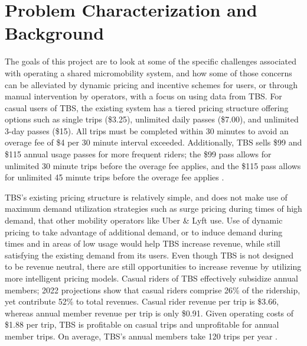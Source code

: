 \documentclass[conference]{IEEEtran}
\begin{document}
\section{Problem Characterization and Background}
The goals of this project are to look at some of the specific challenges associated with operating a shared micromobility system, and how some of those concerns can be alleviated by dynamic pricing and incentive schemes for users, or through manual intervention by operators, with a focus on using data from TBS. For casual users of TBS, the existing system has a tiered pricing structure offering options such as single trips (\$3.25),  unlimited daily passes (\$7.00), and unlimited 3-day passes (\$15). All trips must be completed within 30 minutes to avoid an overage fee of \$4 per 30 minute interval exceeded. Additionally, TBS sells \$99 and \$115 annual usage passes for more frequent riders; the \$99 pass allows for unlimited 30 minute trips before the overage fee applies, and the \$115 pass allows for unlimited 45 minute trips before the overage fee applies \cite{tbs_pricing}. 

TBS's existing pricing structure is relatively simple, and does not make use of maximum demand utilization strategies such as surge pricing during times of high demand, that other mobility operators like Uber \& Lyft use. Use of dynamic pricing to take advantage of additional demand, or to induce demand during times and in areas of low usage would help TBS increase revenue, while still satisfying the existing demand from its users. Even though TBS is not designed to be revenue neutral, there are still opportunities to increase revenue by utilizing more intelligent pricing models. Casual riders of TBS effectively subsidize annual members; 2022 projections show that casual riders comprise 26\% of the ridership, yet contribute 52\% to total revenues. Casual rider revenue per trip is \$3.66, whereas annual member revenue per trip is only \$0.91. Given operating costs of \$1.88 per trip, TBS is profitable on casual trips and unprofitable for annual member trips. On average, TBS's annual members take 120 trips per year \cite{tbs_costs}. 
\end{document}
